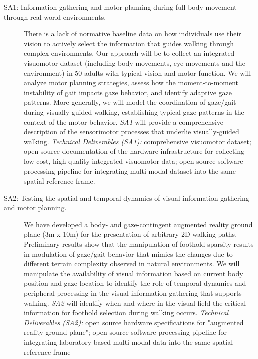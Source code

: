 \begin{description}
	\item[SA1: Information gathering and motor planning during full-body movement through real-world environments.]{There is a lack of normative baseline data on how individuals use their vision to actively select the information that guides walking through complex environments. Our approach will be to collect an integrated visuomotor dataset (including body movements, eye movements and the environment) in 50 adults with typical vision and motor function. We will analyze motor planning strategies, assess how the moment-to-moment instability of gait impacts gaze behavior, and identify adaptive gaze patterns. More generally, we will model the coordination of gaze/gait during visually-guided walking, establishing typical gaze patterns in the context of the motor behavior. \textit{SA1} will provide a comprehensive description of the sensorimotor processes that underlie visually-guided walking. \textit{Technical Deliverables (SA1):} comprehensive visuomotor dataset; open-source documentation of the hardware infrastructure for collecting low-cost, high-quality integrated visuomotor data; open-source software processing pipeline for integrating multi-modal dataset into the same spatial reference frame.}

 
    \item[SA2: Testing the spatial and temporal dynamics of visual information gathering and motor planning.] {We have developed a body- and gaze-contingent augmented reality ground plane (3m x 10m) for the presentation of arbitrary 2D walking paths. Preliminary results show that the manipulation of foothold sparsity results in modulation of gaze/gait behavior that mimics the changes due to different terrain complexity observed in natural environments. We will manipulate the availability of visual information based on current body position and gaze location to identify the role of temporal dynamics and peripheral processing in the visual information gathering that supports walking.  \textit{SA2} will identify when and where in the visual field the critical information for foothold selection during walking occurs. \textit{Technical Deliverables (SA2):} open source hardware specifications for "augmented reality ground-plane"; open-source software processing pipeline for integrating laboratory-based multi-modal data into the same spatial reference frame}


\end{description}
